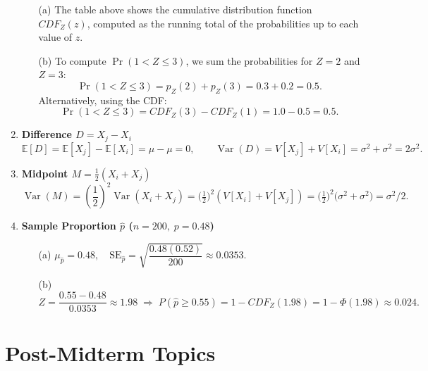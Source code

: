 \documentclass{article}
\begin{document}
\begin{enumerate}
  \begin{enumerate}
    \item[(a)] The table above shows the cumulative distribution function $CDF_Z(z)$, computed as the running total of the probabilities up to each value of $z$.

    \item[(b)] To compute \( \Pr(1 < Z \le 3) \), we sum the probabilities for $Z = 2$ and $Z = 3$:
    \[
    \Pr(1 < Z \le 3) = p_Z(2) + p_Z(3) = 0.3 + 0.2 = 0.5.
    \]
    Alternatively, using the CDF:
    \[
    \Pr(1 < Z \le 3) = CDF_Z(3) - CDF_Z(1) = 1.0 - 0.5 = 0.5.
    \]
  \end{enumerate}


\item \textbf{Difference \(D=X_j-X_i\)}
      \[
        \mathbb E[D]= \mathbb E[X_j] - \mathbb E[X_i]= \mu-\mu=0,\qquad
        \operatorname{Var}(D)=V[X_j] + V[X_i]=\sigma^2+\sigma^2=2\sigma^2.
      \]

\item \textbf{Midpoint \(M=\tfrac12(X_i+X_j)\)}
      \[
        \operatorname{Var}(M)
        = \left(\frac{1}{2}\right)^2\operatorname{Var}(X_i+X_j)
        = \bigl(\tfrac12\bigr)^2(V[X_i]+V[X_j])
        =
        \bigl(\tfrac12\bigr)^2\bigl(\sigma^2+\sigma^2\bigr)=\sigma^2/2.
      \]

\item \textbf{Sample Proportion \(\hat p\) (\(n=200,\;p=0.48\))}
      \begin{enumerate}
        \item[(a)] \(\mu_{\hat p}=0.48,\quad
                     \mathrm{SE}_{\hat p}=\sqrt{\dfrac{0.48(0.52)}{200}}\approx 0.0353.\)
        \item[(b)] \(Z=\dfrac{0.55-0.48}{0.0353}\approx 1.98\;\Rightarrow\;
                    P(\hat p\ge 0.55)=1-CDF_Z(1.98)=1-\Phi(1.98)\approx 0.024.\)
      \end{enumerate}
\end{enumerate}


\section{Post-Midterm Topics}

\end{document}
